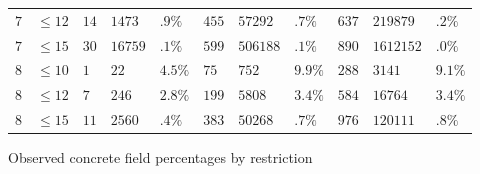 \documentclass[10pt]{amsart}
\numberwithin{equation}{theorem}
\theoremstyle{definition}
\begin{document}
\begin{figure}[h]
{\begin{tabular}{|ll|lll|lll|lll|}
    $7$ & $\le 12$ & $14$ & $1473$ & $.9\%$ & $455$ & $57292$ & $.7\%$ & $637$ & $219879$ & $.2\%$ \\
    $7$ & $\le 15$ & $30$ & $16759$ & $.1\%$ & $599$ & $506188$ & $.1\%$ & $890$ & $1612152$ & $.0\%$ \\
    $8$ & $\le 10$ & $1$ & $22$ & $4.5\%$ & $75$ & $752$ & $9.9\%$ & $288$ & $3141$ & $9.1\%$ \\
    $8$ & $\le 12$ & $7$ & $246$ & $2.8\%$ & $199$ & $5808$ & $3.4\%$ & $584$ & $16764$ & $3.4\%$ \\
    $8$ & $\le 15$ & $11$ & $2560$ & $.4\%$ & $383$ & $50268$ & $.7\%$ & $976$ & $120111$ & $.8\%$ \\
    \hline
  \end{tabular}
  }
  \caption{Observed concrete field percentages by restriction}
  \label{fig:observed-concrete-fields}
\end{figure}
\end{document}
